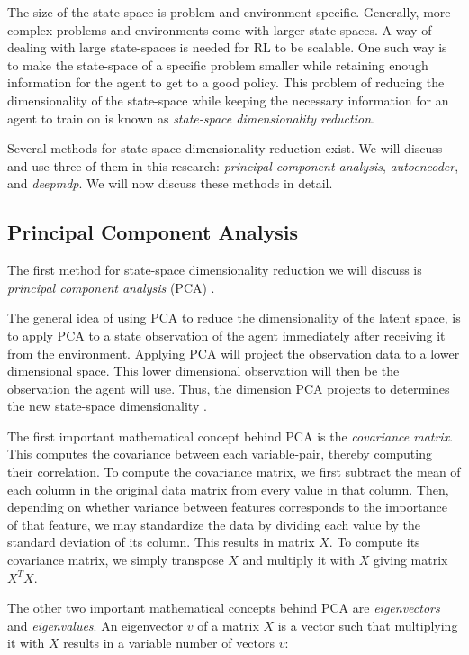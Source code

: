 The size of the state-space is problem and environment specific. Generally, more complex problems and environments come with larger state-spaces. A way of dealing with large state-spaces is needed for RL to be scalable. One such way is to make the state-space of a specific problem smaller while retaining enough information for the agent to get to a good policy. This problem of reducing the dimensionality of the state-space while keeping the necessary information for an agent to train on is known as \emph{state-space dimensionality reduction}.  %

Several methods for state-space dimensionality reduction exist. We will discuss and use three of them in this research: \emph{principal component analysis}, \emph{autoencoder}, and \emph{deepmdp}. We will now discuss these methods in detail. %
\subsection{Principal Component Analysis}\label{pl-pca}
The first method for state-space dimensionality reduction we will discuss is \emph{principal component analysis} (PCA) \cite{pca}. 

The general idea of using PCA to reduce the dimensionality of the latent space, is to apply PCA to a state observation of the agent immediately after receiving it from the environment. Applying PCA will project the observation data to a lower dimensional space. This lower dimensional observation will then be the observation the agent will use. Thus, the dimension PCA projects to determines the new state-space dimensionality \cite{mario}.

The first important mathematical concept behind PCA is the \emph{covariance matrix}. This computes the covariance between each variable-pair, thereby computing their correlation. To compute the covariance matrix, we first subtract the mean of each column in the original data matrix from every value in that column. Then, depending on whether variance between features corresponds to the importance of that feature, we may standardize the data by dividing each value by the standard deviation of its column. This results in matrix $X$. To compute its covariance matrix, we simply transpose $X$ and multiply it with $X$ giving matrix $X^TX$.

The other two important mathematical concepts behind PCA are \emph{eigenvectors} and \emph{eigenvalues}. An eigenvector $v$ of a matrix $X$ is a vector such that multiplying it with $X$ results in a variable number of vectors $v$:

